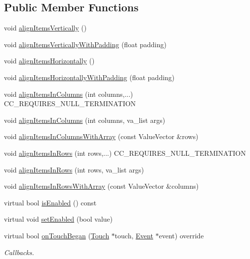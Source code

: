 \subsection*{Public Member Functions}
\begin{DoxyCompactItemize}
\item 
void \hyperlink{classMenu_a9993bc6d1e63107a1ca661ba64a7ebd4}{align\+Items\+Vertically} ()
\item 
void \hyperlink{classMenu_a092a7f04579a919e723587d8cbe1c45d}{align\+Items\+Vertically\+With\+Padding} (float padding)
\item 
void \hyperlink{classMenu_a9b5aed1fdee862b7d1bc64193c90c2b0}{align\+Items\+Horizontally} ()
\item 
void \hyperlink{classMenu_afe60c06457d1f0805d17a4db9d2b150b}{align\+Items\+Horizontally\+With\+Padding} (float padding)
\item 
void \hyperlink{classMenu_a73728acb4dd4cad8bdd8e895014aa522}{align\+Items\+In\+Columns} (int columns,...) C\+C\+\_\+\+R\+E\+Q\+U\+I\+R\+E\+S\+\_\+\+N\+U\+L\+L\+\_\+\+T\+E\+R\+M\+I\+N\+A\+T\+I\+ON
\item 
void \hyperlink{classMenu_a2a568b7bfe853e3c73acba7e3622d220}{align\+Items\+In\+Columns} (int columns, va\+\_\+list args)
\item 
void \hyperlink{classMenu_a68484c458c9e99064204078a6ad2e2e8}{align\+Items\+In\+Columns\+With\+Array} (const Value\+Vector \&rows)
\item 
void \hyperlink{classMenu_aef711df55d67e0b3606049df72041dec}{align\+Items\+In\+Rows} (int rows,...) C\+C\+\_\+\+R\+E\+Q\+U\+I\+R\+E\+S\+\_\+\+N\+U\+L\+L\+\_\+\+T\+E\+R\+M\+I\+N\+A\+T\+I\+ON
\item 
void \hyperlink{classMenu_ac9e28ec85370f45fe4929cd393496a63}{align\+Items\+In\+Rows} (int rows, va\+\_\+list args)
\item 
void \hyperlink{classMenu_a858eac611f439f9f9432e6ebb1ec8cc0}{align\+Items\+In\+Rows\+With\+Array} (const Value\+Vector \&columns)
\item 
virtual bool \hyperlink{classMenu_a8d594f61997bb6ed9f62b083ed7a6001}{is\+Enabled} () const
\item 
virtual void \hyperlink{classMenu_a3f1338bc3391dd127892035935b48cdc}{set\+Enabled} (bool value)
\item 
virtual bool \hyperlink{classMenu_aea88e7147647b3295a5453990c47f1be}{on\+Touch\+Began} (\hyperlink{classTouch}{Touch} $\ast$touch, \hyperlink{classEvent}{Event} $\ast$event) override
\begin{DoxyCompactList}\small\item\em Callbacks. \end{DoxyCompactList}\item 

\end{DoxyCompactItemize}
